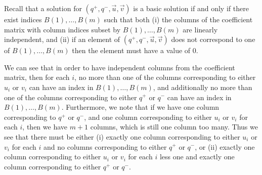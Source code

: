 Recall that a solution for $(q^{+}, q^{-}, \vec{u}, \vec{v})$ is a basic
solution if and only if there exist indices $B(1), \dots, B(m)$ such that both
(i) the columns of the coefficient matrix with column indices subset by
$B(1), \dots, B(m)$ are linearly independent, and (ii) if an element of
$(q^{+}, q^{-}, \vec{u}, \vec{v})$ does not correspond to one of
$B(1), \dots, B(m)$ then the element must have a value of 0.

We can see that in order to have independent columns from the coefficient
matrix, then for each $i$, no more than one of the columns corresponding to
either $u_i$ or $v_i$ can have an index in $B(1), \dots, B(m)$, and additionally
no more than one of the columns corresponding to either $q^{+}$ or $q^{-}$ can
have an index in $B(1), \dots, B(m)$.  Furthermore, we note that if we have one
column corresponding to $q^{+}$ or $q^{-}$, and one column corresponding to
either $u_i$ or $v_i$ for each $i$, then we have $m + 1$ columns, which is still
one column too many.  Thus we see that there must be either (i) exactly one
column corresponding to either $u_i$ or $v_i$ for each $i$ and no columns
corresponding to either $q^{+}$ or $q^{-}$, or (ii) exactly one column
corresponding to either $u_i$ or $v_i$ for each $i$ less one and exactly one
column corresponding to either $q^{+}$ or $q^{-}$.


